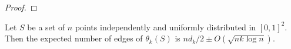 \documentclass{patmorin}
\begin{document}
\begin{proof}
\end{proof}

\begin{lem}
 Let $S$ be a set of $n$ points independently and uniformly distributed
 in $[0,1]^2$.  Then the expected number of edges of $\theta_k(S)$ is 
 $nd_k/2\pm O(\sqrt{nk\log n})$.
\end{lem}
\end{document}

